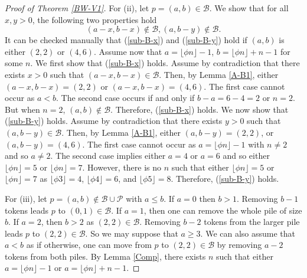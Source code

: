 \documentclass[12pt]{amsart}
\theoremstyle{plain}
\theoremstyle{definition}
\theoremstyle{remark}
\begin{document}
\begin{proof}[Proof of Theorem \ref{BW-V1}]
For (ii), let $p = (a,b) \in {\mathcal{B}}$. We show that for all $x, y > 0$, the following two properties hold
\begin{subequations}
\begin{equation} \label{sub-B-x}
(a-x, b-x) \notin {\mathcal{B}},
\end{equation}
\begin{equation} \label{sub-B-y}
(a,b-y) \notin {\mathcal{B}}.
\end{equation}
\end{subequations}
It can be checked manually that (\ref{sub-B-x}) and (\ref{sub-B-y}) hold if $(a,b)$ is either $(2,2)$ or $(4,6)$. Assume now that $a = \lfloor \phi n \rfloor - 1$, $b = \lfloor \phi n \rfloor +n-1$ for some $n$. We first show that (\ref{sub-B-x}) holds. Assume by contradiction that there exists $x > 0$ such that $(a-x, b-x) \in {\mathcal{B}}$. Then, by Lemma \ref{A-B1}, either $(a-x, b-x) = (2,2)$ or $(a-x, b-x) = (4,6)$. The first case cannot occur as $a < b$. The second case occurs if and only if $b-a = 6-4 = 2$ or $n = 2$. But when $n = 2$, $(a,b) \notin {\mathcal{B}}$. Therefore, (\ref{sub-B-x}) holds. We now show that (\ref{sub-B-y}) holds. Assume by contradiction that there exists $y > 0$ such that $(a, b-y) \in {\mathcal{B}}$. Then, by Lemma \ref{A-B1}, either $(a, b-y) = (2,2)$, or $(a, b-y) = (4,6)$. The first case cannot occur as $a = \lfloor \phi n \rfloor - 1$ with $n \neq 2$ and so $a \neq 2$. The second case implies either $a = 4$ or $a = 6$ and so either $\lfloor \phi n \rfloor = 5$ or $\lfloor \phi n \rfloor = 7$. However, there is no $n$ such that either $\lfloor \phi n \rfloor = 5$ or $\lfloor \phi n \rfloor = 7$ as $\lfloor \phi 3 \rfloor = 4$, $\lfloor \phi 4 \rfloor = 6$, and $\lfloor \phi 5 \rfloor = 8$. Therefore, (\ref{sub-B-y}) holds.

For (iii), let $p = (a,b) \notin {\mathcal{B}} \cup {\mathcal{P}}$ with $a \leq b$. If $a = 0$ then $b > 1$. Removing $b-1$ tokens leads $p$ to $(0,1) \in {\mathcal{B}}$. If $a = 1$, then one can remove the whole pile of size $b$. If $a = 2$, then $b > 2$ as $(2,2) \in {\mathcal{B}}$. Removing $b-2$ tokens from the larger pile leads $p$ to $(2,2) \in {\mathcal{B}}$. So we may suppose that $a \geq 3$. We can also assume that $a < b$ as if otherwise, one can move from $p$ to $(2,2) \in {\mathcal{B}}$ by removing $a-2$ tokens from both piles. By Lemma \ref{Comp}, there exists $n$ such that either $a = \lfloor \phi n \rfloor - 1$ or $a = \lfloor \phi n \rfloor + n - 1$.


\end{proof}
\end{document}
